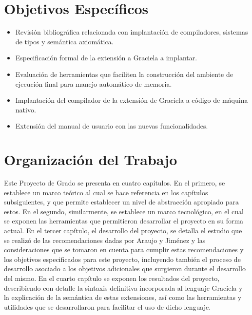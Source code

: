 \section*{Objetivos Específicos}
\begin{itemize}
  \item Revisión bibliográfica relacionada con implantación de compiladores,
  sistemas de tipos y semántica axiomática.

  \item Especificación formal de la extensión a Graciela a implantar.

  \item Evaluación de herramientas que faciliten la construcción del ambiente de
  ejecución final para manejo automático de memoria.

  \item Implantación del compilador de la extensión de Graciela a código de
  máquina nativo.

  \item Extensión del manual de usuario con las nuevas funcionalidades.
\end{itemize}

\section*{Organización del Trabajo}

Este Proyecto de Grado se presenta en cuatro capítulos. En el primero, se
establece un marco teórico al cual se hace referencia en los capítulos
subsiguientes, y que permite establecer un nivel de abstracción apropiado para
estos. En el segundo, similarmente, se establece un marco tecnológico, en el
cual se exponen las herramientas que permitieron desarrollar el proyecto en su
forma actual. En el tercer capítulo, el desarrollo del proyecto, se detalla el
estudio que se realizó de las recomendaciones dadas por Araujo y Jiménez y las
consideraciones que se tomaron en cuenta para cumplir estas recomendaciones y
los objetivos especificados para este proyecto, incluyendo también el proceso de
desarrollo asociado a los objetivos adicionales que surgieron durante el
desarrollo del mismo. En el cuarto capítulo se exponen los resultados del
proyecto, describiendo con detalle la sintaxis definitiva incorporada al
lenguaje Graciela y la explicación de la semántica de estas extensiones, así
como las herramientas y utilidades que se desarrollaron para facilitar el uso de
dicho lenguaje.
